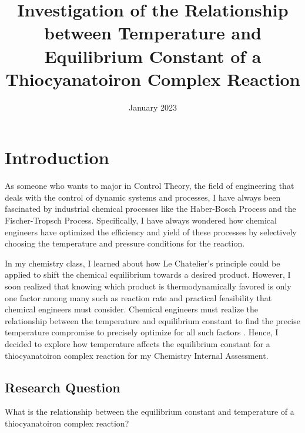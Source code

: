 \documentclass[11pt]{article}
\title{Investigation of the Relationship between Temperature and Equilibrium Constant of a Thiocyanatoiron Complex Reaction}
\author{\censor{Saptak Das}}
\date{January 2023}
\begin{document}
\maketitle

\section{Introduction}
\label{section:introduction}
As someone who wants to major in Control Theory, the field of engineering that deals with the control of dynamic systems and processes, I have always been fascinated by industrial chemical processes like the Haber-Bosch Process and the Fischer-Tropsch Process. Specifically, I have always wondered how chemical engineers have optimized the efficiency and yield of these processes by selectively choosing the temperature and pressure conditions for the reaction.

In my chemistry class, I learned about how Le Chatelier’s principle could be applied to shift the chemical equilibrium towards a desired product. However, I soon realized that knowing which product is thermodynamically favored is only one factor among many such as reaction rate and practical feasibility that chemical engineers must consider. Chemical engineers must realize the relationship between the temperature and equilibrium constant to find the precise temperature compromise to precisely optimize for all such factors \citep{libretextsHaberProcess}. Hence, I decided to explore how temperature affects the equilibrium constant for a thiocyanatoiron complex reaction for my Chemistry Internal Assessment.


\subsection{Research Question}
\noindent
What is the relationship between the equilibrium constant and temperature of a thiocyanatoiron complex reaction?











\newpage


\end{document}

